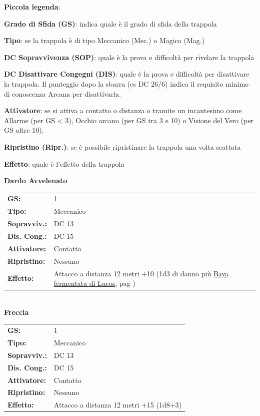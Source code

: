 \begin{multicols}{2}
\medskip

\textbf{Piccola legenda}:

\textbf{Grado di Sfida (GS)}: indica quale è il grado di sfida della trappola

\textbf{Tipo}: se la trappola è di tipo Meccanico (Mec.) o Magico (Mag.)

\textbf{DC Sopravvivenza (SOP)}: quale è la prova e difficoltà per rivelare la trappola

\textbf{DC Disattivare Congegni (DIS)}: quale è la prova e difficoltà per disattivare la trappola. Il punteggio dopo la sbarra (es DC 26/6) indica il requisito minimo di conoscenza Arcana per disattivarla.

\textbf{Attivatore}: se si attiva a contatto o distanza o tramite un incantesimo come Allarme (per GS < 3), Occhio arcano (per GS tra 3 e 10) o Visione del Vero (per GS oltre 10).

\textbf{Ripristino (Ripr.)}: se è possibile ripristinare la trappola una volta scattata

\textbf{Effetto}: quale è l'effetto della trappola

\bigskip

\textbf{Dardo Avvelenato}

\begin{tabularx}{0.48\textwidth}{lX}
	\textbf{GS:} & 1 \\
	\textbf{Tipo:} & Meccanico \\
	\textbf{Sopravviv.:} & DC 13 \\
	\textbf{Dis. Cong.:} & DC 15 \\
	\textbf{Attivatore:} & Contatto \\
	\textbf{Ripristino:} & Nessuno \\
	\textbf{Effetto:} & Attacco a distanza 12 metri +10 (1d3 di danno più \hyperlink{bavadilucos}{Bava fermentata di Lucos}, pag \pageref{bavadilucos}) 
\end{tabularx}\\

\textbf{Freccia}

\begin{tabularx}{0.48\textwidth}{lX}
	\textbf{GS:} & 1 \\
	\textbf{Tipo:} & Meccanico \\
	\textbf{Sopravviv.:} & DC 13 \\
	\textbf{Dis. Cong.:} & DC 15 \\
	\textbf{Attivatore:} & Contatto \\
	\textbf{Ripristino:} & Nessuno \\
	\textbf{Effetto:} & Attacco a distanza 12 metri +15 (1d8+3) 
\end{tabularx}\\


\end{multicols}

